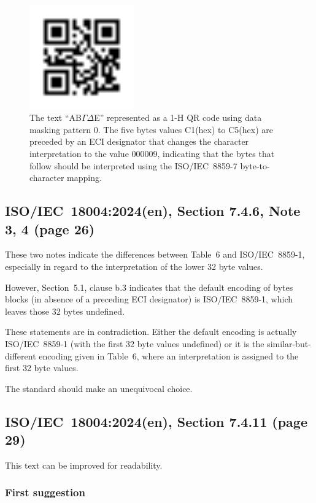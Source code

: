 \documentclass[a4paper,twoside]{article}
\newcommand{\shortstandard}{ISO/IEC~18004}
\newcommand{\standard}{\shortstandard:2024(en)}
\newcommand{\hex}[1]{#1(hex)}
\begin{document}
\begin{figure}[h]
\centering
\includegraphics[width=0.4\textwidth]{images/qrcode_iso18004_2024_QRCodeSymbol_1Mp6.png}
\caption{The text ``AB$\mathit{\Gamma\Delta}$E'' represented as a 1-H QR code using data masking pattern 0.
         The five bytes values \hex{C1} to \hex{C5} are preceded by an ECI designator that changes the character
         interpretation to the value 000009, indicating that the bytes that follow should be interpreted using
         the ISO/IEC~8859-7 byte-to-character mapping.}
\end{figure}

\subsection{\standard, Section 7.4.6, Note 3, 4 (page 26)}

These two notes indicate the differences between Table~6 and ISO/IEC~8859-1, especially in
regard to the interpretation of  the lower 32 byte values.

However, Section~5.1, clause b.3 indicates that the default encoding of bytes blocks
(in absence of a preceding ECI designator) is ISO/IEC~8859-1, which leaves those 32 bytes
undefined.

These statements are in contradiction. Either the default encoding is actually ISO/IEC~8859-1
(with the first 32 byte values undefined) or it is the similar-but-different encoding given
in Table~6, where an interpretation is assigned to the first 32 byte values.

The standard should make an unequivocal choice.

\subsection{\standard, Section 7.4.11 (page 29)}

This text can be improved for readability.

\subsubsection*{First suggestion}
\end{document}
